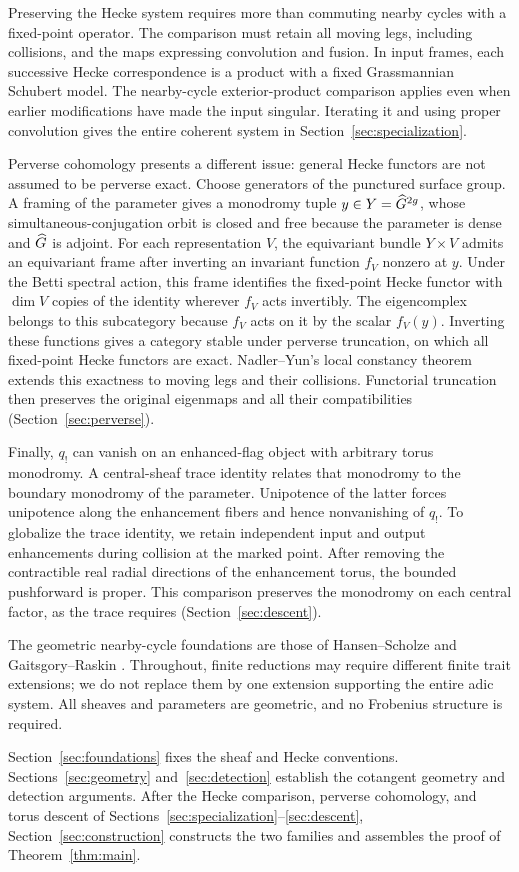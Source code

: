 Preserving the Hecke system requires more than commuting nearby cycles
with a fixed-point operator. The comparison must retain all moving legs,
including collisions, and the maps expressing convolution and fusion.
In input frames, each successive Hecke correspondence is a product with
a fixed Grassmannian Schubert model. The nearby-cycle exterior-product
comparison applies even when earlier modifications have made the input
singular. Iterating it and using proper convolution gives the entire
coherent system in Section~\ref{sec:specialization}.

Perverse cohomology presents a different issue: general Hecke functors
are not assumed to be perverse exact. Choose generators of the punctured
surface group. A framing of the parameter gives a monodromy tuple
$y\in Y=\widehat G^{2g}$, whose simultaneous-conjugation orbit is closed and free
because the parameter is dense and $\widehat G$ is adjoint. For each representation
$V$, the equivariant bundle $Y\times V$ admits an equivariant frame after
inverting an
invariant function $f_V$ nonzero at $y$. Under the Betti spectral action,
this frame identifies the fixed-point Hecke functor with $\dim V$ copies
of the identity wherever $f_V$ acts invertibly. The eigencomplex belongs
to this subcategory because $f_V$ acts on it by the scalar $f_V(y)$.
Inverting these functions gives a category stable under perverse
truncation, on which all fixed-point Hecke functors are exact.
Nadler--Yun's local constancy theorem extends this exactness to moving legs
and their collisions. Functorial truncation then preserves the original
eigenmaps and all their compatibilities (Section~\ref{sec:perverse}).

Finally, $q_!$ can vanish on an enhanced-flag object with arbitrary torus
monodromy. A central-sheaf trace identity relates that monodromy to the
boundary monodromy of the parameter. Unipotence of the latter forces
unipotence along the enhancement fibers and hence nonvanishing of $q_!$.
To globalize the trace identity, we retain independent input and output
enhancements during collision at the marked point. After removing the
contractible real radial directions of the enhancement torus, the bounded
pushforward is proper. This comparison preserves the monodromy on each
central factor, as the trace requires (Section~\ref{sec:descent}).

The geometric nearby-cycle foundations are those of
Hansen--Scholze \cite{HansenScholze} and Gaitsgory--Raskin \cite{GR}.
Throughout, finite reductions may require different finite trait
extensions; we do not replace them by one extension supporting the entire
adic system. All sheaves and parameters are geometric, and no Frobenius
structure is required.

Section~\ref{sec:foundations} fixes the sheaf and Hecke conventions.
Sections~\ref{sec:geometry} and~\ref{sec:detection} establish the cotangent
geometry and detection arguments. After the Hecke comparison, perverse
cohomology, and torus descent of
Sections~\ref{sec:specialization}--\ref{sec:descent},
Section~\ref{sec:construction} constructs the two families and assembles
the proof of Theorem~\ref{thm:main}.
